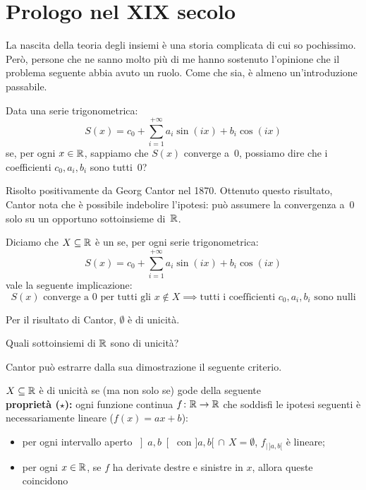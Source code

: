 \section{Prologo nel XIX secolo}
La nascita della teoria degli insiemi \`e una storia complicata di cui so pochissimo. Per\`o, persone che ne sanno molto pi\`u di me hanno sostenuto l'opinione che il problema seguente
abbia avuto un ruolo. Come che sia, \`e almeno un'introduzione passabile.

\begin{problem}
Data una serie trigonometrica:
\[ S(x) = c_0 + \sum_{i=1}^{+\infty}a_i\sin{(ix)}+b_i\cos{(ix)}
	\]
se, per ogni $x \in \mathbb R$, sappiamo che $S(x)$ converge a~$0$, possiamo dire che i coefficienti $c_0,a_i,b_i$ sono tutti~$0$?
\end{problem}

Risolto positivamente da Georg Cantor nel 1870. Ottenuto questo risultato, Cantor nota che \`e possibile
indebolire l'ipotesi: pu\`o assumere la convergenza a~$0$ solo su un opportuno
sottoinsieme di~$\mathbb R$.

\begin{definition}
Diciamo che $X \subseteq \mathbb R$ \`e un  se, per ogni serie trigonometrica:
\[ S(x) = c_0 + \sum_{i=1}^{+\infty}a_i\sin{(ix)}+b_i\cos{(ix)}
	\]
vale la seguente implicazione:
\[ \text{$S(x)$ converge a~$0$ per tutti gli $x\not\in X$} \implies \text{tutti i coefficienti $c_0,a_i,b_i$ sono nulli}
	\]
\end{definition}

\begin{example}
	Per il risultato di Cantor, $\emptyset$ \`e di unicit\`a.
\end{example}

\begin{problem}
	Quali sottoinsiemi di $\mathbb R$ sono di unicit\`a?
\end{problem}

Cantor pu\`o estrarre dalla sua dimostrazione il seguente criterio.

\begin{fact}
$X \subseteq \mathbb R$ \`e di unicit\`a se (ma non solo se) gode della seguente\\
\textbf{propriet\`a ($\star$):}
ogni funzione continua $f\colon\mathbb R \to \mathbb R$ che soddisfi le ipotesi seguenti
\`e necessariamente lineare 
{\drkgrn ($f(x) = ax+b$):}
\begin{itemize}
	\item per ogni intervallo aperto $\left]a,b\right[$ con $]a,b[
\,\cap\, X = \emptyset$, $f_{| \, ]a,b[}$ \`e lineare;
	\item per ogni $x \in \mathbb R$, se $f$ ha derivate destre e sinistre in $x$, allora queste coincidono
\end{itemize}
\end{fact}

